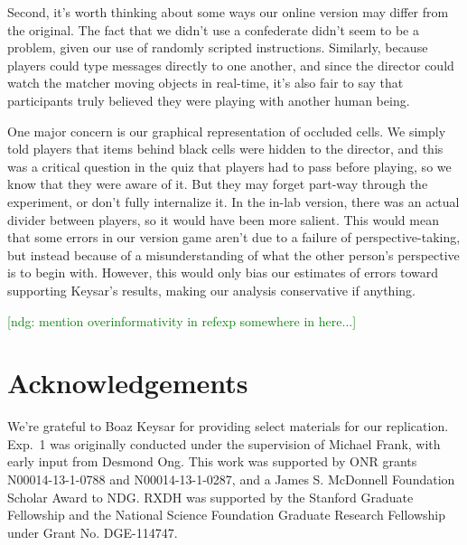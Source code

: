 \documentclass[10pt,letterpaper]{article}
\newcommand{\ndg}[1]{\textcolor{Green}{[ndg: #1]}}
\begin{document}
Second, it's worth thinking about some ways our online version may differ from the original. The fact that we didn't use a confederate didn't seem to be a problem, given our use of randomly scripted instructions. Similarly, because players could type messages directly to one another, and since the director could watch the matcher moving objects in real-time, it's also fair to say that participants truly believed they were playing with another human being. 


One major concern is our graphical representation of occluded cells. We simply told players that items behind black cells were hidden to the director, and this was a critical question in the quiz that players had to pass before playing, so we know that they were aware of it. But they may forget part-way through the experiment, or don't fully internalize it. In the in-lab version, there was an actual divider between players, so it would have been more salient. This would mean that some errors in our version game aren't due to a failure of perspective-taking, but instead because of a misunderstanding of what the other person's perspective is to begin with. However, this would only bias our estimates of errors toward supporting Keysar's results, making our analysis conservative if anything. 


\ndg{mention overinformativity in refexp somewhere in here...}

\section{Acknowledgements}

\small We're grateful to Boaz Keysar for providing select materials for our replication. Exp.~1 was originally conducted under the supervision of Michael Frank, with early input from Desmond Ong. This work was supported by ONR grants N00014-13-1-0788 and N00014-13-1-0287,  and a James S. McDonnell Foundation Scholar Award to NDG. RXDH was supported by the Stanford Graduate Fellowship and the National Science Foundation Graduate Research Fellowship under Grant No. DGE-114747. 



\setlength{\bibleftmargin}{.125in}
\setlength{\bibindent}{-\bibleftmargin}


\end{document}
